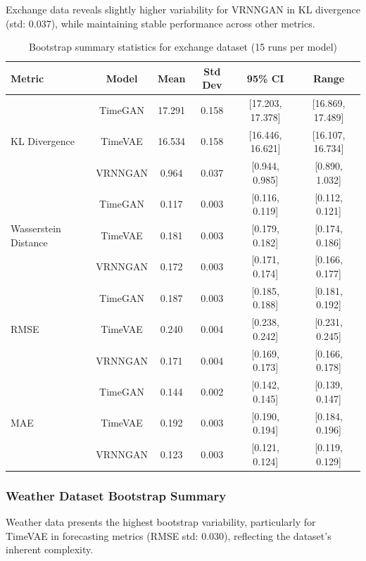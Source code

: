 \documentclass[11pt]{article}
\begin{document}
Exchange data reveals slightly higher variability for VRNNGAN in KL divergence (std: 0.037), while maintaining stable performance across other metrics.
\begin{table}[H]
    \centering
\caption{Bootstrap summary statistics for exchange dataset (15 runs per model)}
\label{tab:bootstrap_exchange}
\small
\begin{tabular}{lccccc}
\toprule
\textbf{Metric} & \textbf{Model} & \textbf{Mean} & \textbf{Std Dev} & \textbf{95\% CI} & \textbf{Range} \\
\midrule
\multirow{3}{*}{KL Divergence} 
    & TimeGAN   & 17.291 & 0.158 & [17.203, 17.378] & [16.869, 17.489] \\
    & TimeVAE   & 16.534 & 0.158 & [16.446, 16.621] & [16.107, 16.734] \\
    & VRNNGAN   & 0.964  & 0.037 & [0.944, 0.985]   & [0.890, 1.032] \\
\midrule
\multirow{3}{*}{Wasserstein Distance} 
    & TimeGAN   & 0.117 & 0.003 & [0.116, 0.119] & [0.112, 0.121] \\
    & TimeVAE   & 0.181 & 0.003 & [0.179, 0.182] & [0.174, 0.186] \\
    & VRNNGAN   & 0.172 & 0.003 & [0.171, 0.174] & [0.166, 0.177] \\
\midrule
\multirow{3}{*}{RMSE} 
    & TimeGAN   & 0.187 & 0.003 & [0.185, 0.188] & [0.181, 0.192] \\
    & TimeVAE   & 0.240 & 0.004 & [0.238, 0.242] & [0.231, 0.245] \\
    & VRNNGAN   & 0.171 & 0.004 & [0.169, 0.173] & [0.166, 0.178] \\
\midrule
\multirow{3}{*}{MAE} 
    & TimeGAN   & 0.144 & 0.002 & [0.142, 0.145] & [0.139, 0.147] \\
    & TimeVAE   & 0.192 & 0.003 & [0.190, 0.194] & [0.184, 0.196] \\
    & VRNNGAN   & 0.123 & 0.003 & [0.121, 0.124] & [0.119, 0.129] \\
\bottomrule
\end{tabular}
\end{table}

\newpage
\subsubsection{Weather Dataset Bootstrap Summary}

Weather data presents the highest bootstrap variability, particularly for TimeVAE in forecasting metrics (RMSE std: 0.030), reflecting the dataset's inherent complexity.
\end{document}
